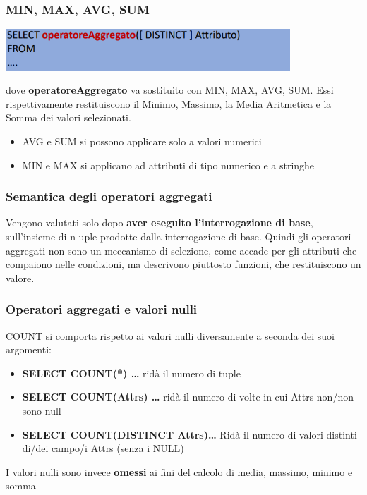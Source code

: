 \documentclass[12pt]{article}
\begin{document}
\subsubsection{MIN, MAX, AVG, SUM}
\begin{center}
    \includegraphics[width = 0.80\textwidth]{Images/215.PNG}
\end{center}
dove \textbf{operatoreAggregato} va sostituito con MIN, MAX, AVG, SUM.
Essi rispettivamente restituiscono il Minimo, Massimo, la Media Aritmetica e la Somma dei valori selezionati.
\begin{itemize}
    \item AVG  e SUM si possono applicare solo a valori numerici
    \item MIN e MAX si applicano ad attributi di tipo numerico e a stringhe
\end{itemize}
\subsubsection{Semantica degli operatori aggregati}
Vengono valutati solo dopo \textbf{aver eseguito l'interrogazione di base},
sull'insieme di n-uple prodotte dalla interrogazione di base.
Quindi gli operatori aggregati non sono un meccanismo di selezione, come accade per gli attributi che compaiono nelle condizioni, ma descrivono piuttosto funzioni, che restituiscono un valore.
\subsubsection{Operatori aggregati e valori nulli}
COUNT si comporta rispetto ai valori nulli diversamente a seconda dei suoi argomenti:
\begin{itemize}
    \item \textbf{SELECT COUNT(*) \dots} ridà il numero di tuple
    \item \textbf{SELECT COUNT(Attrs) \dots} ridà il numero di volte in cui Attrs non/non sono null
    \item \textbf{SELECT COUNT(DISTINCT Attrs)\dots} Ridà il numero di valori distinti di/dei campo/i Attrs (senza i NULL) 
\end{itemize}
I valori nulli sono invece \textbf{omessi} ai fini del calcolo di media, massimo, minimo e somma
\end{document}
